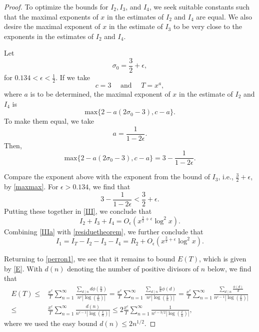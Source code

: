 \documentclass[11pt,reqno]{amsart}
\theoremstyle{plain}
\numberwithin{equation}{section}
\begin{document}
\begin{proof}
To optimize the bounds for $I_2, I_3$, and $I_4$, we seek suitable constants such that the maximal exponents of $x$ in the estimates of $I_2$ and $I_4$ are  equal.  We also desire the maximal exponent of $x$ in the estimate of $I_3$ to be very close to the exponents in the estimates of  $I_2$ and $I_4$.


 Let
 \begin{equation}\label{maxmax}
  \sigma_0=\frac{3}{2}+\epsilon,
  \end{equation}
  for $0.134<\epsilon <\frac{1}{2}$.
If we take
\begin{equation}\label{G2}
c= 3 \quad\text{ and } \quad T=x^{a},
\end{equation}
 where $a$ is to be determined,
 the maximal exponent of $x$ in the estimate of $I_2$ and $I_4$ is
 $$\mathrm{max}\{2-a(2\sigma_0-3), c-a\}.$$
 To make them equal, we take $$a=\frac{1}{1-2\epsilon}.$$
 Then,
  \begin{equation}\label{G2_1}
  \mathrm{max}\{2-a(2\sigma_0-3), c-a\}=3-\frac{1}{1-2\epsilon}.
  \end{equation}



  Compare the exponent above with the exponent from the bound of $I_3$, i.e., $\frac{3}{2}+\epsilon$, by \eqref{maxmax}. For $\epsilon>0.134$,  we find that
$$3-\frac{1}{1-2\epsilon} < \frac{3}{2}+\epsilon.$$
   Putting these together in \eqref{III}, we conclude that
   \begin{equation}\label{IIIa}
  I_2+I_3+I_4 =  O_\epsilon(x^{\frac{3}{2}+{\epsilon}}\log^2x).
  \end{equation}
  Combining \eqref{IIIa} with \eqref{residuetheorem}, we further conclude that
  \begin{equation}\label{IV}
  I_1=I_T-I_2-I_3-I_4 = R_2+ O_\epsilon(x^{\frac{3}{2}+{\epsilon}}\log^2x).
  \end{equation}

  Returning to \eqref{perron1}, we see that it remains to bound $E(T)$, which is given by \eqref{E}.  With $d(n)$ denoting the number of positive divisors of $n$ below, we find that
\begin{align}
        E(T)\leq &\frac{x^c}{T}\sum _{n=1}^\infty \frac{\sum_{d\mid n }d\phi(\frac{n}{d})}{n^c|\log(\frac{x}{n})|}=\frac{x^c}{T}\sum _{n=1}^\infty \frac{\sum_{d\mid n }\frac{n}{d}\phi(d)}{n^c |\log(\frac{x}{n})|}
        =\frac{x^c}{T}\sum _{n=1}^\infty \frac{\sum_{d\mid n }\frac{\phi(d)}{d}}{n^{c-1} |\log(\frac{x}{n})|}\nonumber\\
        \leq&  \frac{x^c}{T}\sum _{n=1}^\infty \frac{d(n)}{n^{c-1} |\log(\frac{x}{n})|}
        \leq 2\frac{x^c}{T} \sum_{n=1 }^\infty \frac{1}{n^{c-3/2}|\log (\frac{x}{n})|},\label{E(T)}
           \end{align}
 where we used the easy bound $d(n)\leq 2n^{1/2}$.


\end{proof}
\end{document}
